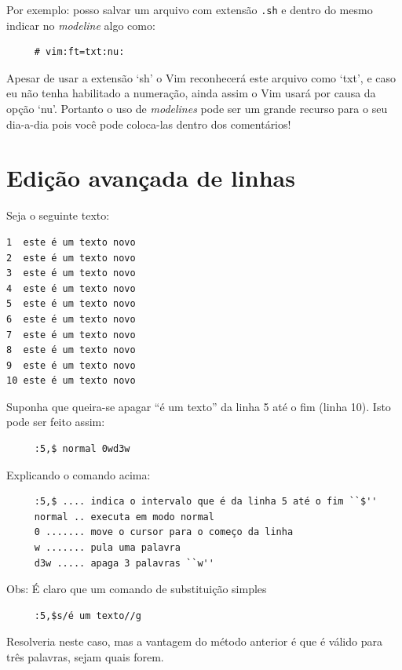 \documentclass[10pt,a4paper,openany]{book}
\begin{document}
Por exemplo: posso salvar um arquivo com extensão \verb|.sh| e dentro do
mesmo indicar no {\em modeline} algo como:

\begin{verbatim}
     # vim:ft=txt:nu:
\end{verbatim}

Apesar de usar a extensão `sh' o Vim reconhecerá este arquivo como `txt', e
caso eu não tenha habilitado a numeração, ainda assim o Vim usará por causa da
opção `nu'.  Portanto o uso de {\em modelines} pode ser um grande recurso para o seu
dia-a-dia pois você pode coloca-las dentro dos comentários!

\section{Edição avançada de linhas}

Seja o seguinte texto:

\begin{verbatim}
1  este é um texto novo
2  este é um texto novo
3  este é um texto novo
4  este é um texto novo
5  este é um texto novo
6  este é um texto novo
7  este é um texto novo
8  este é um texto novo
9  este é um texto novo
10 este é um texto novo
\end{verbatim}

Suponha que queira-se apagar ``é um texto'' da linha 5 até o fim (linha 10). Isto pode ser feito
assim: 

\begin{verbatim}
     :5,$ normal 0wd3w
\end{verbatim}

Explicando o comando acima:

\begin{verbatim}
     :5,$ .... indica o intervalo que é da linha 5 até o fim ``$''
     normal .. executa em modo normal
     0 ....... move o cursor para o começo da linha
     w ....... pula uma palavra
     d3w ..... apaga 3 palavras ``w''
\end{verbatim}

Obs: É claro que um comando de substituição simples

\begin{verbatim}
     :5,$s/é um texto//g
\end{verbatim}

Resolveria neste caso, mas a vantagem do método anterior é que
é válido para três palavras, sejam quais forem.\\
\end{document}
